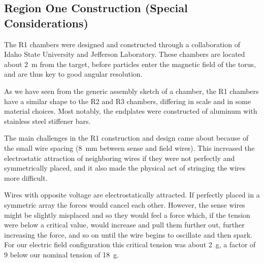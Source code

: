 \subsection{Region One Construction (Special Considerations)}

The R1 chambers were designed and constructed through a collaboration 
of Idaho State University and Jefferson Laboratory.  These 
chambers are located about 2~m from the target, 
before particles enter the magnetic field of the torus,
and are thus key to good angular resolution. 

As we have seen from the generic assembly sketch of a chamber, the R1
chambers have a similar shape to the R2 and R3 chambers, differing in
scale and in some material choices.
Most notably, the endplates were constructed of aluminum with stainless
steel stiffener bars.

The main challenges in the R1 construction and design came about because
of the small wire spacing (8~mm between sense and field wires).  This
increased the electrostatic attraction of neighboring wires if they were
not perfectly and symmetrically placed, and it also made the physical act
of stringing the wires more difficult.

Wires with opposite voltage are electrostatically attracted.  If perfectly
placed in a symmetric array the forces would cancel each other. 
However, the sense wires might be slightly misplaced and so they would feel
a force which, if the tension were below a critical value, would increase
and pull them further out, further increasing the force, and so on until 
the wire begins to oscillate and then spark.  For our electric field configuration
this critical tension was about 2~g, a factor of 9 below our nominal
tension of 18~g.

